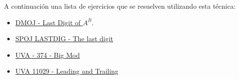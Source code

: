 A continuación una lista de ejercicios que se resuelven utilizando esta técnica:

\begin{itemize}
	\item \href{https://dmoj.uclv.edu.cu/problem/digitlast} {DMOJ - Last Digit of $A^B$}.
	\item \href{https://www.spoj.com/problems/LASTDIG/}{SPOJ LASTDIG - The last digit}
	\item \href{https://onlinejudge.org/index.php?option=com_onlinejudge&Itemid=8&category=24&page=show_problem&problem=310}{UVA - 374 - Big Mod}
	\item \href{https://onlinejudge.org/index.php?option=onlinejudge&page=show_problem&problem=1970}{UVA 11029 - Leading and Trailing}
\end{itemize}